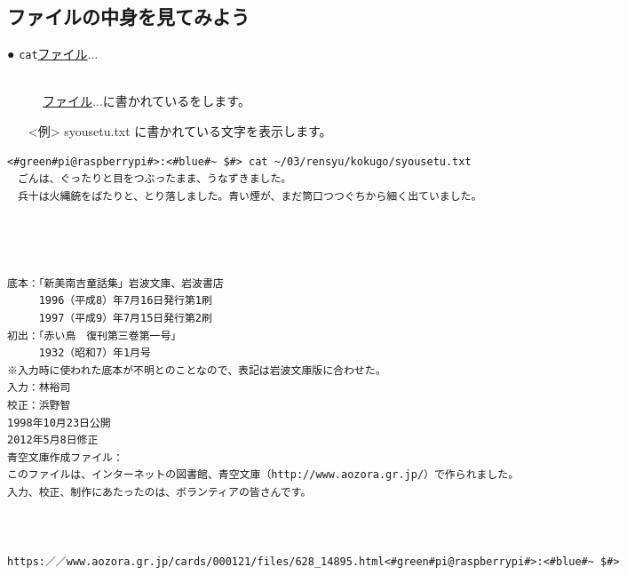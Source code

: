 \subsection{ファイルの中身を見てみよう}
\begin{description}
\item[● \texttt{cat}\textvisiblespace \underline{ファイル}$\ldots$ ]\mbox{}\\
\underline{ファイル}$\ldots$に書かれているをします。
\end{description}
\begin{itemize}
\item[<例>]syousetu.txt に書かれている文字を表示します。
\end{itemize}
\begin{lstlisting}[caption=catの例, label=cat]
<#green#pi@raspberrypi#>:<#blue#~ $#> cat ~/03/rensyu/kokugo/syousetu.txt
　ごんは、ぐったりと目をつぶったまま、うなずきました。
　兵十は火縄銃をばたりと、とり落しました。青い煙が、まだ筒口つつぐちから細く出ていました。




底本：「新美南吉童話集」岩波文庫、岩波書店
　　　1996（平成8）年7月16日発行第1刷
　　　1997（平成9）年7月15日発行第2刷
初出：「赤い鳥　復刊第三巻第一号」
　　　1932（昭和7）年1月号
※入力時に使われた底本が不明とのことなので、表記は岩波文庫版に合わせた。
入力：林裕司
校正：浜野智
1998年10月23日公開
2012年5月8日修正
青空文庫作成ファイル：
このファイルは、インターネットの図書館、青空文庫（http://www.aozora.gr.jp/）で作られました。
入力、校正、制作にあたったのは、ボランティアの皆さんです。



https:／／www.aozora.gr.jp/cards/000121/files/628_14895.html<#green#pi@raspberrypi#>:<#blue#~ $#>
\end{lstlisting}



